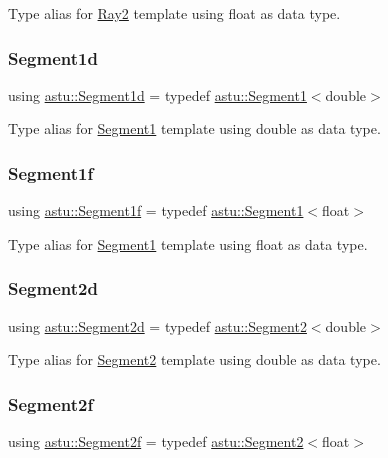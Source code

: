 Type alias for \hyperlink{classastu_1_1Ray2}{Ray2} template using float as data type. \mbox{\label{namespaceastu_a3ed894c1b9f965fa9905c6f5a71ab5d4}} 
\subsubsection{\texorpdfstring{Segment1d}{Segment1d}}
{\footnotesize\ttfamily using \hyperlink{namespaceastu_a3ed894c1b9f965fa9905c6f5a71ab5d4}{astu\+::\+Segment1d} = typedef \hyperlink{classastu_1_1Segment1}{astu\+::\+Segment1}$<$double$>$}

Type alias for \hyperlink{classastu_1_1Segment1}{Segment1} template using double as data type. \mbox{\label{namespaceastu_adaf20507cd638f02e10a5437a9810623}} 
\subsubsection{\texorpdfstring{Segment1f}{Segment1f}}
{\footnotesize\ttfamily using \hyperlink{namespaceastu_adaf20507cd638f02e10a5437a9810623}{astu\+::\+Segment1f} = typedef \hyperlink{classastu_1_1Segment1}{astu\+::\+Segment1}$<$float$>$}

Type alias for \hyperlink{classastu_1_1Segment1}{Segment1} template using float as data type. \mbox{\label{namespaceastu_a4a6a4a3ba71e40694ac08f39fa00a3bc}} 
\subsubsection{\texorpdfstring{Segment2d}{Segment2d}}
{\footnotesize\ttfamily using \hyperlink{namespaceastu_a4a6a4a3ba71e40694ac08f39fa00a3bc}{astu\+::\+Segment2d} = typedef \hyperlink{classastu_1_1Segment2}{astu\+::\+Segment2}$<$double$>$}

Type alias for \hyperlink{classastu_1_1Segment2}{Segment2} template using double as data type. \mbox{\label{namespaceastu_ab93de73c36660369f18786b88125e902}} 
\subsubsection{\texorpdfstring{Segment2f}{Segment2f}}
{\footnotesize\ttfamily using \hyperlink{namespaceastu_ab93de73c36660369f18786b88125e902}{astu\+::\+Segment2f} = typedef \hyperlink{classastu_1_1Segment2}{astu\+::\+Segment2}$<$float$>$}

